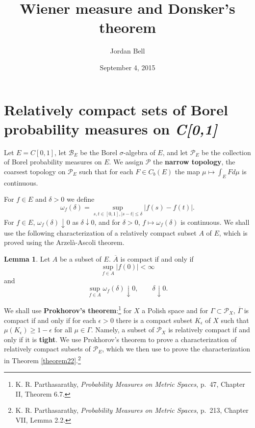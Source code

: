 \documentclass{article}
\theoremstyle{definition}
\newtheorem{lemma}[theorem]{Lemma}
\theoremstyle{definition}
\begin{document}
\title{Wiener measure and Donsker's theorem}
\author{Jordan Bell}
\date{September 4, 2015}

\maketitle

\section{Relatively compact sets of Borel probability measures on {\em C[0,1]}}
Let $E=C[0,1]$, let $\mathscr{B}_E$ be the Borel $\sigma$-algebra of $E$, and let $\mathscr{P}_E$ be the collection of Borel probability measures on $E$. We assign $\mathscr{P}$ the \textbf{narrow topology}, the coarsest topology
on $\mathscr{P}_E$ such that for each $F \in C_b(E)$ the map $\mu \mapsto \int_E F d\mu$ is continuous.



For $f \in E$ and $\delta>0$ we define
\[
\omega_f(\delta) = \sup_{s,t \in [0,1], |s-t| \leq \delta} |f(s)-f(t)|.
\]
For $f \in E$, $\omega_f(\delta) \downarrow 0$ as $\delta \downarrow 0$, and for $\delta>0$,
$f \mapsto \omega_f(\delta)$ is continuous.
We shall use the following characterization of a relatively compact subset $A$ of $E$, which is proved using the Arzel\`a-Ascoli theorem.

\begin{lemma}
Let $A$ be a  subset of $E$. $\overline{A}$ is compact if and only if
\[
\sup_{f \in A} |f(0)| < \infty
\]
and
\[
\sup_{f \in A} \omega_f(\delta) \downarrow 0,\qquad \delta \downarrow 0.
\]
\label{modulus}
\end{lemma}

We shall use \textbf{Prokhorov's theorem}:\footnote{K. R.
Parthasarathy, {\em Probability Measures on Metric Spaces}, p.~47, Chapter II, Theorem 6.7.}
for $X$ a Polish space and for $\Gamma \subset \mathscr{P}_X$, 
$\overline{\Gamma}$ is compact if and only if for each $\epsilon>0$ there is a compact
subset $K_\epsilon$ of $X$ such that $\mu(K_\epsilon) \geq 1-\epsilon$ for all $\mu \in \Gamma$. 
Namely, a subset of $\mathscr{P}_X$ is relatively compact if and only if it is \textbf{tight}.
We use Prokhorov's theorem to   prove a characterization of relatively compact subsets of $\mathscr{P}_E$, which we then use 
to prove the characterization  in Theorem \ref{theorem22}.\footnote{K. R.
Parthasarathy, {\em Probability  Measures on Metric Spaces}, p.~213, Chapter VII, Lemma 2.2.}
\end{document}
